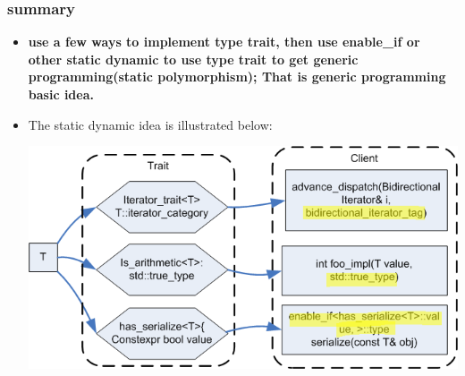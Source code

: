 \documentclass[a4paper,11pt,twoside]{book}
\begin{document}
\subsubsection{summary}
\begin{itemize}
	\item \textbf{use a few ways to implement type trait, then use enable\_if or other static dynamic to use type trait to get generic programming(static polymorphism); That is generic programming basic idea.}
		
	\item The static dynamic idea is illustrated below:

\begin{center}
	\includegraphics[scale=0.9]{pics/tag_dispatch.png}
\end{center}
	
\end{itemize}
\end{document}
